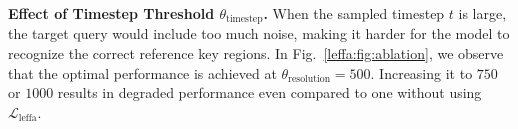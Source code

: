 

\noindent \textbf{Effect of Timestep Threshold $\theta_{\text{timestep}}$.}
When the sampled timestep $t$ is large, the target query would include too much noise, making it harder for the model to recognize the correct reference key regions.
In Fig.~\ref{leffa:fig:ablation}, we observe that the optimal performance is achieved at $\theta_{\text{resolution}} = 500$.
Increasing it to $750$ or $1000$ results in degraded performance even compared to one without using $\mathcal{L}_{\text{leffa}}$. 


